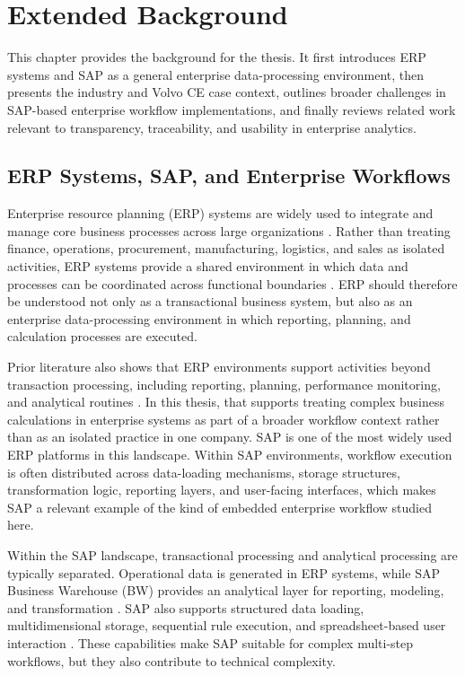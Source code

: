 



\chapter{Extended Background} \label{cha:extendBackground}



This chapter provides the background for the thesis. It first introduces ERP systems and SAP as a general enterprise data-processing environment, then presents the industry and Volvo CE case context, outlines broader challenges in SAP-based enterprise workflow implementations, and finally reviews related work relevant to transparency, traceability, and usability in enterprise analytics.


\section{ERP Systems, SAP, and Enterprise Workflows}

Enterprise resource planning (ERP) systems are widely used to integrate and manage core business processes across large organizations \cite{davenport1998,klaus2000}. Rather than treating finance, operations, procurement, manufacturing, logistics, and sales as isolated activities, ERP systems provide a shared environment in which data and processes can be coordinated across functional boundaries \cite{sap_erp_guide}. ERP should therefore be understood not only as a transactional business system, but also as an enterprise data-processing environment in which reporting, planning, and calculation processes are executed.

Prior literature also shows that ERP environments support activities beyond transaction processing, including reporting, planning, performance monitoring, and analytical routines \cite{monk2012erp}. In this thesis, that supports treating complex business calculations in enterprise systems as part of a broader workflow context rather than as an isolated practice in one company. SAP is one of the most widely used ERP platforms in this landscape. Within SAP environments, workflow execution is often distributed across data-loading mechanisms, storage structures, transformation logic, reporting layers, and user-facing interfaces, which makes SAP a relevant example of the kind of embedded enterprise workflow studied here.

Within the SAP landscape, transactional processing and analytical processing are typically separated. Operational data is generated in ERP systems, while SAP Business Warehouse (BW) provides an analytical layer for reporting, modeling, and transformation \cite{sap_bw_guide}. SAP also supports structured data loading, multidimensional storage, sequential rule execution, and spreadsheet-based user interaction \cite{sap_bw_ip_overview,sap_analysis_office_guide}. These capabilities make SAP suitable for complex multi-step workflows, but they also contribute to technical complexity.


